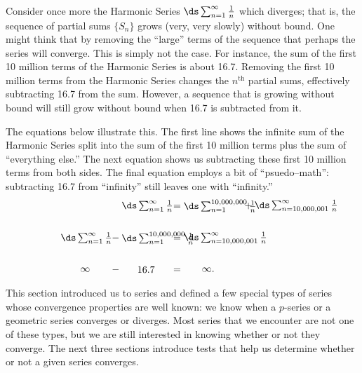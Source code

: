 Consider once more the Harmonic Series $\ds\sum_{n=1}^\infty  \frac1n$ which diverges; that is, the sequence of partial sums $\{S_n\}$ grows (very, very slowly) without bound. One might think that by removing the ``large'' terms of the sequence that perhaps the series will converge. This is simply not the case. For instance, the sum of the first 10 million terms of the Harmonic Series is about 16.7. Removing the first 10 million terms from the Harmonic Series changes the $n^\text{th}$ partial sums,  effectively subtracting 16.7 from the sum. However, a sequence that is growing without bound will still grow without bound when 16.7 is subtracted from it. 

The equations below illustrate this. The first line shows the infinite sum of the Harmonic Series split into the sum of the first 10 million terms plus the sum of ``everything else.'' The next equation shows us subtracting these first 10 million terms from both sides. The final equation employs a bit of ``psuedo--math'': subtracting 16.7 from ``infinity'' still leaves one with ``infinity.''
\begin{align*}
 \parbox{50pt}{\centering$\ds\sum_{n=1}^\infty \frac1n$} &= \parbox{50pt}{\centering$\ds\sum_{n=1}^{10,000,000}\frac1n$}\quad + \parbox{50pt}{\centering$\ds\sum_{n=10,000,001}^\infty \frac1n$} \rule[-20pt]{0pt}{1pt} \\
 \parbox{50pt}{\centering$\ds\sum_{n=1}^\infty \frac1n$} - \parbox{50pt}{\centering$\ds\sum_{n=1}^{10,000,000}\frac1n$}&= \parbox{50pt}{\centering$\ds\sum_{n=10,000,001}^\infty \frac1n$} \rule[-20pt]{0pt}{1pt}\\
\parbox{50pt}{\centering	$\infty$} - \parbox{50pt}{\centering $16.7$} &=  \parbox{50pt}{\centering$\infty.$}
\end{align*}													

This section introduced us to series and defined a few special types of series whose convergence properties are well known: we know when a $p$-series or a geometric series converges or diverges. Most series that we encounter are not one of these types, but we are still interested in knowing whether or not they converge. The next three sections introduce tests that help us determine whether or not a given series converges. 


